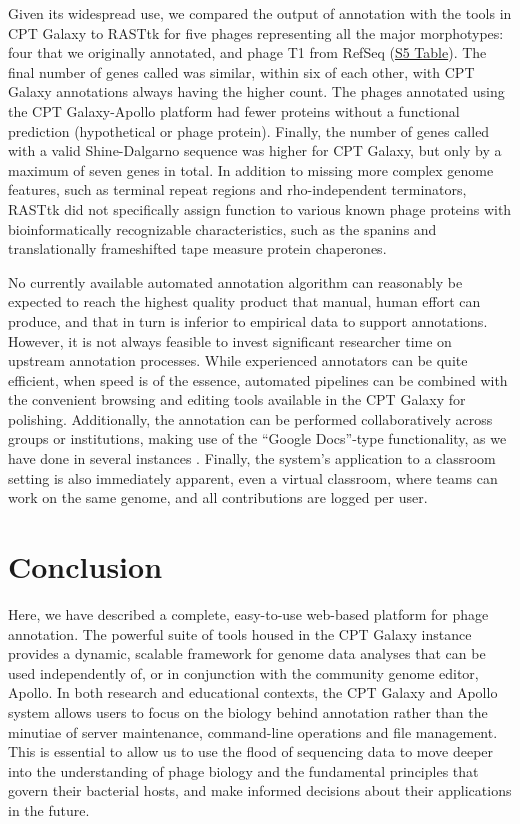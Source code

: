 Given its widespread use, we compared the output of annotation with the
tools in CPT Galaxy to RASTtk for five phages representing all the major
morphotypes: four that we originally annotated, and phage T1 from RefSeq
(\protect\hyperlink{pcbi.1008214.s005}{S5 Table}). The final number of
genes called was similar, within six of each other, with CPT Galaxy
annotations always having the higher count. The phages annotated using
the CPT Galaxy-Apollo platform had fewer proteins without a functional
prediction (hypothetical or phage protein). Finally, the number of genes
called with a valid Shine-Dalgarno sequence was higher for CPT Galaxy,
but only by a maximum of seven genes in total. In addition to missing
more complex genome features, such as terminal repeat regions and
rho-independent terminators, RASTtk did not specifically assign function
to various known phage proteins with bioinformatically recognizable
characteristics, such as the spanins and translationally frameshifted
tape measure protein chaperones.

No currently available automated annotation algorithm can reasonably be
expected to reach the highest quality product that manual, human effort
can produce, and that in turn is inferior to empirical data to support
annotations. However, it is not always feasible to invest significant
researcher time on upstream annotation processes. While experienced
annotators can be quite efficient, when speed is of the essence,
automated pipelines can be combined with the convenient browsing and
editing tools available in the CPT Galaxy for polishing. Additionally,
the annotation can be performed collaboratively across groups or
institutions, making use of the ``Google Docs''-type functionality, as
we have done in several instances \cite{Marc_2019,Culbertson_2019,Freeman_2019}. Finally, the system's
application to a classroom setting is also immediately apparent, even a
virtual classroom, where teams can work on the same genome, and all
contributions are logged per user.

\section*{Conclusion}

Here, we have described a complete, easy-to-use web-based platform for
phage annotation. The powerful suite of tools housed in the CPT Galaxy
instance provides a dynamic, scalable framework for genome data analyses
that can be used independently of, or in conjunction with the community
genome editor, Apollo. In both research and educational contexts, the
CPT Galaxy and Apollo system allows users to focus on the biology behind
annotation rather than the minutiae of server maintenance, command-line
operations and file management. This is essential to allow us to use the
flood of sequencing data to move deeper into the understanding of phage
biology and the fundamental principles that govern their bacterial
hosts, and make informed decisions about their applications in the
future.

